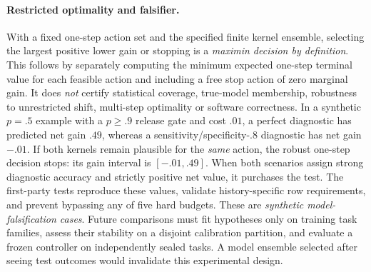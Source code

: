 \documentclass[pdflatex,sn-basic]{sn-jnl}
\begin{document}
\paragraph{Restricted optimality and falsifier.}
With a fixed one-step action set and the specified finite
kernel ensemble, selecting the largest positive lower
gain or stopping is a \emph{maximin decision by definition}.
This follows by separately computing the minimum expected
one-step terminal value for each feasible action and
including a free stop action of zero marginal gain.
It does \emph{not} certify statistical coverage,
true-model membership, robustness to unrestricted
shift, multi-step optimality or software correctness.
In a synthetic $p=.5$ example with a $p\ge.9$
release gate and cost $.01$, a perfect diagnostic
has predicted net gain $.49$, whereas a
sensitivity/specificity-$.8$ diagnostic has net
gain $-.01$. If both kernels remain plausible
for the \emph{same} action, the robust one-step
decision stops: its gain interval is
$[-.01,.49]$. When both scenarios assign
strong diagnostic accuracy and strictly
positive net value, it purchases the test.
The first-party tests reproduce these values,
validate history-specific row requirements,
and prevent bypassing any of five hard budgets.
These are \emph{synthetic model-falsification cases}.
Future comparisons must fit hypotheses only on
training task families, assess their stability
on a disjoint calibration partition, and evaluate
a frozen controller on independently sealed tasks.
A model ensemble selected after seeing test outcomes
would invalidate this experimental design.
\end{document}
